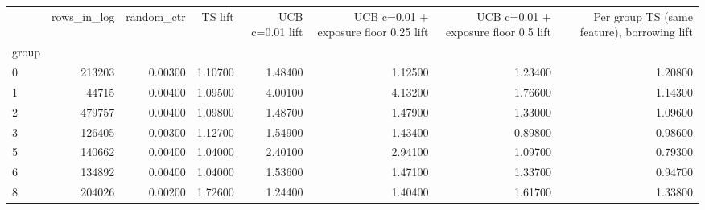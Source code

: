 \begin{tabular}{lrrrrrrr}
\toprule
 & rows\_in\_log & random\_ctr & TS lift & UCB c=0.01 lift & UCB c=0.01 + exposure floor 0.25 lift & UCB c=0.01 + exposure floor 0.5 lift & Per group TS (same feature), borrowing lift \\
group &  &  &  &  &  &  &  \\
\midrule
0 & 213203 & 0.00300 & 1.10700 & 1.48400 & 1.12500 & 1.23400 & 1.20800 \\
1 & 44715 & 0.00400 & 1.09500 & 4.00100 & 4.13200 & 1.76600 & 1.14300 \\
2 & 479757 & 0.00400 & 1.09800 & 1.48700 & 1.47900 & 1.33000 & 1.09600 \\
3 & 126405 & 0.00300 & 1.12700 & 1.54900 & 1.43400 & 0.89800 & 0.98600 \\
5 & 140662 & 0.00400 & 1.04000 & 2.40100 & 2.94100 & 1.09700 & 0.79300 \\
6 & 134892 & 0.00400 & 1.04000 & 1.53600 & 1.47100 & 1.33700 & 0.94700 \\
8 & 204026 & 0.00200 & 1.72600 & 1.24400 & 1.40400 & 1.61700 & 1.33800 \\
\bottomrule
\end{tabular}
